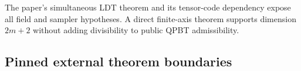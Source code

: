 
The paper's simultaneous LDT theorem and its tensor-code dependency expose all
field and sampler hypotheses. A direct finite-axis theorem supports dimension
$2m+2$ without adding divisibility to public QPBT admissibility.

\subsection{Pinned external theorem boundaries}



